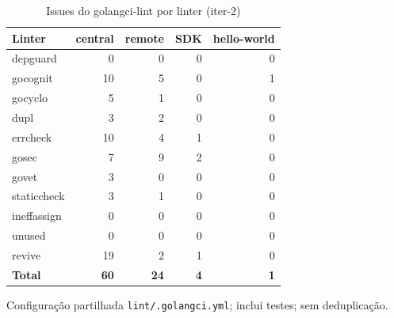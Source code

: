 \begin{table}[htbp]
  \centering\small
  \caption{Issues do golangci-lint por linter (iter-2)}
  \label{tab:iter-2-lint}
  \begin{tabular}{lrrrr}
    \toprule
    Linter & central & remote & SDK & hello-world \\
    \midrule
    depguard & 0 & 0 & 0 & 0 \\
    gocognit & 10 & 5 & 0 & 1 \\
    gocyclo & 5 & 1 & 0 & 0 \\
    dupl & 3 & 2 & 0 & 0 \\
    errcheck & 10 & 4 & 1 & 0 \\
    gosec & 7 & 9 & 2 & 0 \\
    govet & 3 & 0 & 0 & 0 \\
    staticcheck & 3 & 1 & 0 & 0 \\
    ineffassign & 0 & 0 & 0 & 0 \\
    unused & 0 & 0 & 0 & 0 \\
    revive & 19 & 2 & 1 & 0 \\
    \textbf{Total} & \textbf{60} & \textbf{24} & \textbf{4} & \textbf{1} \\
    \bottomrule
  \end{tabular}
  \par\smallskip\footnotesize Configuração partilhada \texttt{lint/.golangci.yml}; inclui testes; sem deduplicação.
\end{table}
